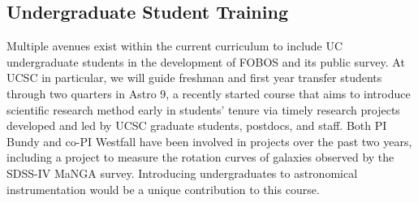 \documentclass[oneside,11pt]{amsart}
\newcommand{\comment}[2][todo]{{\color{#1}[[{\bf #2}]]}}
\begin{document}

% 
% 
% 
% 
% 
% 
% 
% 
% 
% 
% 


\subsection{Undergraduate Student Training}

Multiple avenues exist within the current curriculum to include UC
undergraduate students in the development of FOBOS and its public
survey.  At UCSC in particular, we will guide freshman and first year
transfer students through two quarters in Astro 9, a recently started
course that aims to introduce scientific research method early in
students' tenure via timely research projects developed and led by UCSC
graduate students, postdocs, and staff.  Both PI Bundy and co-PI
Westfall have been involved in projects over the past two years,
including a project to measure the rotation curves of galaxies observed
by the SDSS-IV MaNGA survey.  Introducing undergraduates to astronomical
instrumentation would be a unique contribution to this course.






\end{document}
